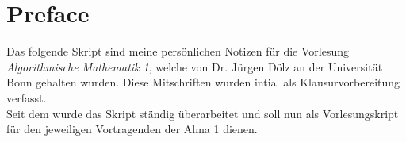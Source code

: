\chapter*{Preface}

Das folgende Skript sind meine persönlichen Notizen für die Vorlesung \emph{Algorithmische Mathematik 1}, welche von Dr. Jürgen Dölz an der Universität Bonn gehalten wurden. 
Diese Mitschriften wurden intial als Klausurvorbereitung verfasst. \\
Seit dem wurde das Skript ständig überarbeitet und soll nun als Vorlesungskript für den jeweiligen Vortragenden der Alma 1 dienen.









